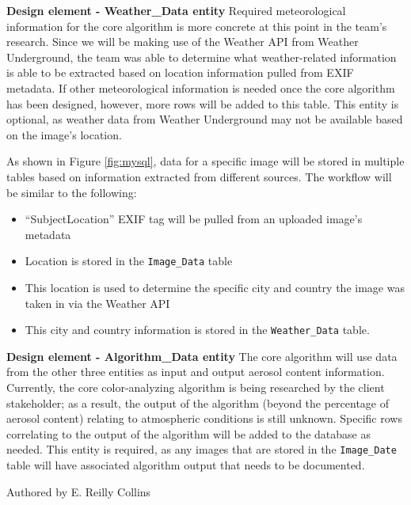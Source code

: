 \documentclass[onecolumn, draftclsnofoot,10pt, compsoc]{IEEEtran}
\begin{document}
\begin{flushleft}
\medskip

\textbf{Design element - Weather\_Data entity} Required meteorological information for the core algorithm is more concrete at this point in the team’s research. Since we will be making use of the Weather API from Weather Underground, the team was able to determine what weather-related information is able to be extracted based on location information pulled from EXIF metadata. If other meteorological information is needed once the core algorithm has been designed, however, more rows will be added to this table. This entity is optional, as weather data from Weather Underground may not be available based on the image’s location. 

\medskip

As shown in Figure \ref{fig:mysql}, data for a specific image will be stored in multiple tables based on information extracted from different sources. The workflow will be similar to the following:
\begin{itemize}
\item  “SubjectLocation” EXIF tag will be pulled from an uploaded image’s metadata 
\item  Location is stored in the \texttt{Image\_Data} table
\item This location is used to determine the specific city and country the image was taken in via the Weather API
\item This city and country information is stored in the \texttt{Weather\_Data} table.
\end{itemize}

\medskip 

\textbf{Design element - Algorithm\_Data entity}
The core algorithm will use data from the other three entities as input and output aerosol content information. Currently, the core color-analyzing algorithm is being researched by the client stakeholder; as a result, the output of the algorithm (beyond the percentage of aerosol content) relating to atmospheric conditions is still unknown. Specific rows correlating to the output of the algorithm will be added to the database as needed. This entity is required, as any images that are stored in the \texttt{Image\_Date} table will have associated algorithm output that needs to be documented.

\smallskip

\footnotesize Authored by E. Reilly Collins

\normalsize

\bigskip



\end{flushleft}
\end{document}
